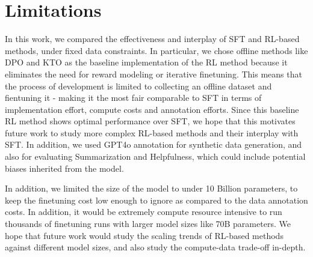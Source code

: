 \section{Limitations} 

In this work, we compared the effectiveness and interplay of SFT and RL-based methods, under fixed data constraints. In particular, we chose offline methods like DPO and KTO as the baseline implementation of the RL method because it eliminates the need for reward modeling or iterative finetuning. This means that the process of development is limited to collecting an offline dataset and fientuning it - making it the most fair comparable to SFT in terms of implementation effort, compute costs and annotation efforts. Since this baseline RL method shows optimal performance over SFT, we hope that this motivates future work to study more complex RL-based methods and their interplay with SFT. In addition, we used GPT4o annotation for synthetic data generation, and also for evaluating Summarization and Helpfulness, which could include potential biases inherited from the model. 

In addition, we limited the size of the model to under 10 Billion parameters, to keep the finetuning cost low enough to ignore as compared to the data annotation costs. In addition, it would be extremely compute resource intensive to run thousands of finetuning runs with larger model sizes like 70B parameters. We hope that future work would study the scaling trends of RL-based methods against different model sizes, and also study the compute-data trade-off in-depth.

